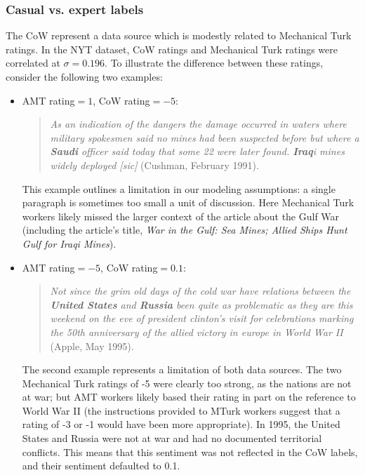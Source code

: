 \subsubsection{Casual vs. expert labels}
The CoW represent a data source which is modestly related to
Mechanical Turk ratings. In the NYT dataset, CoW ratings and
Mechanical Turk ratings were correlated at $\sigma=0.196$.  To
illustrate the difference between these ratings, consider the
following two examples:
\begin{itemize}
  \item AMT rating$= 1$, CoW rating$=-5$:
\begin{quote} 
  \emph{As an
    indication of the dangers the damage occurred in waters where
    military spokesmen said no mines had been suspected before but
    where a \textbf{Saudi} officer said today that some 22 were later
    found. \textbf{Iraq}i mines widely deployed [sic]} (Cushman, February 1991).
  \nocite{cushman:1991}
\end{quote}
This example outlines a limitation in our modeling
assumptions: a single paragraph is sometimes too small a unit of
discussion.  Here Mechanical Turk workers likely missed
the larger context of the article about the Gulf War (including the
article's title, \emph{War in the Gulf: Sea Mines; Allied Ships Hunt
  Gulf for Iraqi Mines}).
\item AMT rating$ = -5$, CoW rating$=0.1$: \begin{quote}\emph{Not since
    the grim old days of the cold war have relations between the
    \textbf{United States} and \textbf{Russia} been quite as problematic as they
    are this weekend on the eve of president clinton's visit for
    celebrations marking the 50th anniversary of the allied victory in
    europe in World War II} (Apple, May 1995). \nocite{apple:1995}
\end{quote}
The second example represents a limitation of both data sources.  The
two Mechanical Turk ratings of -5 were clearly too strong, as the
nations are not at war; but AMT workers likely based their rating in
part on the reference to World War II (the instructions provided to
MTurk workers suggest that a rating of -3 or -1 would have been more
appropriate).  In 1995, the United States and Russia were not at war
and had no documented territorial conflicts.  This means that this
sentiment was not reflected in the CoW labels, and their sentiment
defaulted to 0.1.
\end{itemize}

\label{section:experiments}

